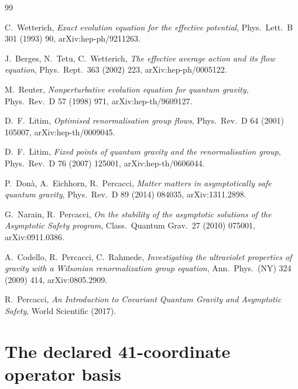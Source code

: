 \documentclass[11pt]{article}
\begin{document}
\begin{thebibliography}{99}

 C.~Wetterich, \emph{Exact evolution equation for the
effective potential}, Phys.\ Lett.\ B 301 (1993) 90, arXiv:hep-ph/9211263.

 J.~Berges, N.~Tetu, C.~Wetterich,
\emph{The effective average action and its flow equation}, Phys.\ Rept.\ 363
(2002) 223, arXiv:hep-ph/0005122.

 M.~Reuter, \emph{Nonperturbative evolution equation for
quantum gravity}, Phys.\ Rev.\ D 57 (1998) 971, arXiv:hep-th/9609127.

 D.~F.~Litim, \emph{Optimised renormalisation group flows},
Phys.\ Rev.\ D 64 (2001) 105007, arXiv:hep-th/0009045.

 D.~F.~Litim, \emph{Fixed points of quantum gravity and the
renormalisation group}, Phys.\ Rev.\ D 76 (2007) 125001,
arXiv:hep-th/0606044.

 P.~Don\`a, A.~Eichhorn, R.~Percacci, \emph{Matter matters in
asymptotically safe quantum gravity}, Phys.\ Rev.\ D 89 (2014) 084035,
arXiv:1311.2898.

 G.~Narain, R.~Percacci, \emph{On the stability of the
asymptotic solutions of the Asymptotic Safety program}, Class.\ Quantum
Grav.\ 27 (2010) 075001, arXiv:0911.0386.

 A.~Codello, R.~Percacci, C.~Rahmede, \emph{Investigating the
ultraviolet properties of gravity with a Wilsonian renormalization group
equation}, Ann.\ Phys.\ (NY) 324 (2009) 414, arXiv:0805.2909.

 R.~Percacci, \emph{An Introduction to Covariant
Quantum Gravity and Asymptotic Safety}, World Scientific (2017).

\end{thebibliography}

\appendix

\section{The declared 41-coordinate operator basis}
\label{app:operators}
\end{document}
